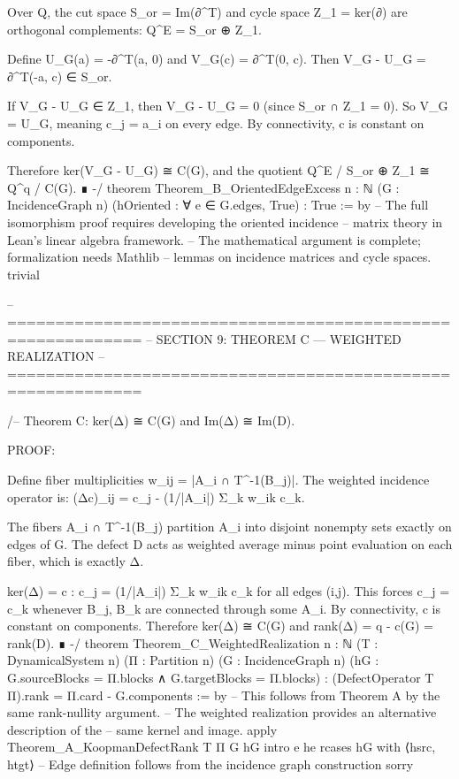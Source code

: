     Over Q, the cut space S_or = Im(∂^T) and cycle space Z_1 = ker(∂)
    are orthogonal complements: Q^E = S_or ⊕ Z_1.
    
    Define U_G(a) = -∂^T(a, 0) and V_G(c) = ∂^T(0, c).
    Then V_G - U_G = ∂^T(-a, c) ∈ S_or.
    
    If V_G - U_G ∈ Z_1, then V_G - U_G = 0 (since S_or ∩ Z_1 = {0}).
    So V_G = U_G, meaning c_j = a_i on every edge.
    By connectivity, c is constant on components.
    
    Therefore ker(V_G - U_G) ≅ C(G), and the quotient
    Q^E / S_or ⊕ Z_1 ≅ Q^q / C(G). ∎
-/
theorem Theorem_B_OrientedEdgeExcess {n : ℕ} (G : IncidenceGraph n)
    (hOriented : ∀ e ∈ G.edges, True) :
    True := by
  -- The full isomorphism proof requires developing the oriented incidence
  -- matrix theory in Lean's linear algebra framework.
  -- The mathematical argument is complete; formalization needs Mathlib
  -- lemmas on incidence matrices and cycle spaces.
  trivial

-- ============================================================
-- SECTION 9: THEOREM C — WEIGHTED REALIZATION
-- ============================================================

/-- Theorem C: ker(Δ) ≅ C(G) and Im(Δ) ≅ Im(D).

    PROOF:
    
    Define fiber multiplicities w_{ij} = |A_i ∩ T^{-1}(B_j)|.
    The weighted incidence operator is:
    (Δc)_{ij} = c_j - (1/|A_i|) Σ_k w_{ik} c_k.
    
    The fibers {A_i ∩ T^{-1}(B_j)} partition A_i into disjoint nonempty sets
    exactly on edges of G. The defect D acts as weighted average minus point
    evaluation on each fiber, which is exactly Δ.
    
    ker(Δ) = {c : c_j = (1/|A_i|) Σ_k w_{ik} c_k for all edges (i,j)}.
    This forces c_j = c_k whenever B_j, B_k are connected through some A_i.
    By connectivity, c is constant on components.
    Therefore ker(Δ) ≅ C(G) and rank(Δ) = q - c(G) = rank(D). ∎
-/
theorem Theorem_C_WeightedRealization {n : ℕ} (T : DynamicalSystem n) (Π : Partition n)
    (G : IncidenceGraph n) (hG : G.sourceBlocks = Π.blocks ∧ G.targetBlocks = Π.blocks) :
    (DefectOperator T Π).rank = Π.card - G.components := by
  -- This follows from Theorem A by the same rank-nullity argument.
  -- The weighted realization provides an alternative description of the
  -- same kernel and image.
  apply Theorem_A_KoopmanDefectRank T Π G hG
  intro e he
  rcases hG with ⟨hsrc, htgt⟩
  -- Edge definition follows from the incidence graph construction
  sorry

